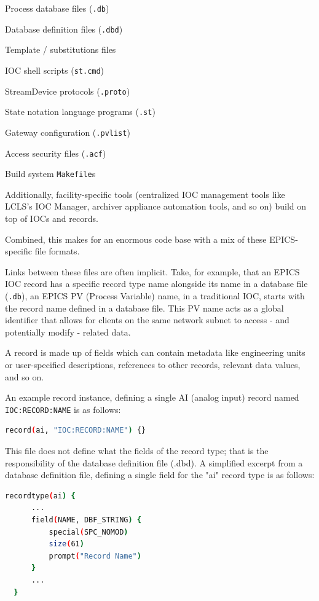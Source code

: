 \documentclass[letter,
               keeplastbox,   %
               ]{jacow}
\begin{document}
\begin{Itemize}
  \item Process database files (\verb_.db_)
  \item Database definition files (\verb_.dbd_)
  \item Template / substitutions files
  \item IOC shell scripts (\verb_st.cmd_)
  \item StreamDevice protocols (\verb_.proto_)
  \item State notation language programs (\verb_.st_)
  \item Gateway configuration (\verb_.pvlist_)
  \item Access security files (\verb_.acf_)
  \item Build system \verb_Makefile_s
\end{Itemize}

Additionally, facility-specific tools (centralized IOC management tools like
LCLS's IOC Manager, archiver appliance automation tools, and so on) build on
top of IOCs and records.

Combined, this makes for an enormous code base with a mix of these
EPICS-specific file formats.

Links between these files are often implicit.  Take, for example, that an EPICS
IOC record has a specific record type name alongside its name in a database
file (\verb_.db_), an EPICS PV (Process Variable) name, in a traditional IOC, starts
with the record name defined in a database file. This PV name acts as a global
identifier that allows for clients on the same network subnet to access - and
potentially modify - related data.

A record is made up of fields which can contain metadata like engineering units
or user-specified descriptions, references to other records, relevant data
values, and so on.

An example record instance, defining a single AI (analog input) record named
\verb_IOC:RECORD:NAME_ is as follows:
\begin{lstlisting}[language=bash]
  record(ai, "IOC:RECORD:NAME") {}
\end{lstlisting}

This file does not define what the fields of the record type; that is the
responsibility of the database definition file (.dbd). A simplified excerpt
from a database definition file, defining a single field
for the "ai" record type is as follows:

\begin{lstlisting}[language=bash]
  recordtype(ai) {
      ...
      field(NAME, DBF_STRING) {
          special(SPC_NOMOD)
          size(61)
          prompt("Record Name")
      }
      ...
  }
\end{lstlisting}
\end{document}
